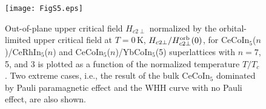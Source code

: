 \documentclass[twocolumn,preprintnumbers,amsmath,amssymb,prl]{revtex4}
\begin{document}
\newpage

\begin{figure}[h]
	\texttt{[image: FigS5.eps]}
	\caption{Out-of-plane upper critical field $H_{c2\perp}$ normalized by the orbital-limited upper critical field at $T=0$\,K, $H_{c2\perp}/H_{c2\perp}^{\rm orb}(0)$, for CeCoIn$_5$($n$)/CeRhIn$_5$($n$) and CeCoIn$_5$($n$)/YbCoIn$_5$(5) superlattices with $n=7$, 5, and 3  is plotted as a function of the normalized temperature $T/T_c$.   Two extreme cases, i.e., the result of  the bulk CeCoIn$_5$ dominated by Pauli paramagnetic effect and the WHH curve with no Pauli effect, are also shown.  }
\end{figure}

 
\end{document}
